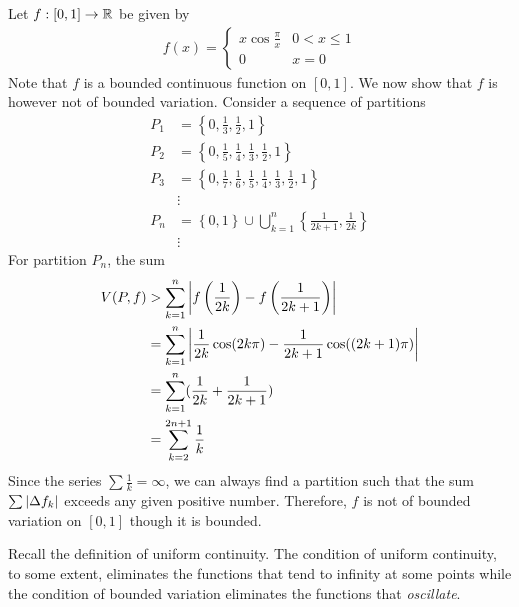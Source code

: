 \documentclass[thmcnt=section, 12pt]{my-elegantbook}
\begin{document}
\begin{example}
    Let $f: [0, 1] \to \mathbb{R}$ be given by 
    \begin{align*}
        f(x) = \begin{cases}
            x\cos \frac{\pi}{x} &0 < x \leq 1 \\
            0 &x = 0
        \end{cases}
    \end{align*}
    Note that $f$ is a bounded continuous function on $[0, 1]$. We now show that $f$ is however not of bounded variation. Consider a sequence of partitions 
    \begin{align*}
        P_1 &= \left\{
            0, \frac{1}{3}, \frac{1}{2}, 1
        \right\} \\ 
        P_2 &= \left\{
            0, 
            \frac{1}{5}, \frac{1}{4},
            \frac{1}{3}, \frac{1}{2}, 
            1
        \right\} \\ 
        P_3 &= \left\{
            0, 
            \frac{1}{7}, \frac{1}{6},
            \frac{1}{5}, \frac{1}{4},
            \frac{1}{3}, \frac{1}{2}, 
            1
        \right\} \\ 
        &\vdots \\ 
        P_n &= \left\{
            0, 1
        \right\} \cup \bigcup_{k=1}^n \left\{
            \frac{1}{2k+1}, \frac{1}{2k}
        \right\} \\ 
        &\vdots
    \end{align*}
    For partition $P_n$, the sum 
    \begin{align*}
        V(P, f)
        &> \sum_{k=1}^n \left\lvert 
            f\left( \frac{1}{2k} \right) 
            - f\left( \frac{1}{2k+1} \right)
         \right\rvert \\
        &= \sum_{k=1}^n \left\lvert 
            \frac{1}{2k}\cos(2k\pi) 
            - \frac{1}{2k+1}\cos((2k+1)\pi)
         \right\rvert \\ 
        &= \sum_{k=1}^n (
            \frac{1}{2k}
            + \frac{1}{2k+1}
        ) \\ 
        &= \sum_{k=2}^{2n+1} \frac{1}{k}
    \end{align*}
    Since the series $\sum \frac{1}{k} = \infty$, we can always find a partition such that the sum $\sum \left\lvert \Delta f_k \right\rvert$ exceeds any given positive number. Therefore, $f$ is not of bounded variation on $[0, 1]$ though it is bounded.
    \label{eg:6}
\end{example}

\par Recall the definition of uniform continuity. The condition of uniform continuity, to some extent, eliminates the functions that tend to infinity at some points while the condition of bounded variation eliminates the functions that \textit{oscillate}. 
\end{document}
